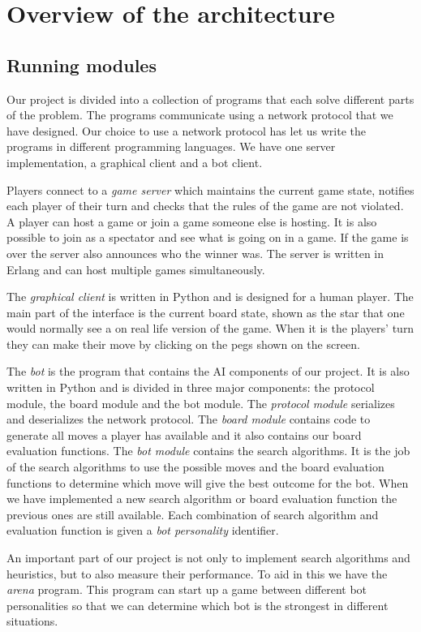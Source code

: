 \section{Overview of the architecture}
\subsection{Running modules}

Our project is divided into a collection of programs that each solve
different parts of the problem. The programs communicate using a
network protocol that we have designed. Our choice to use a network
protocol has let us write the programs in different programming
languages. We have one server implementation, a graphical client and a
bot client.


Players connect to a \emph{game server} which maintains the current
game state, notifies each player of their turn and checks that the
rules of the game are not violated. A player can host a game or join a
game someone else is hosting. It is also possible to join as a
spectator and see what is going on in a game. If the game is over the
server also announces who the winner was. The server is written in
Erlang and can host multiple games simultaneously.

The \emph{graphical client} is written in Python and is designed for a
human player. The main part of the interface is the current board
state, shown as the star that one would normally see a on real life
version of the game. When it is the players' turn they can make their
move by clicking on the pegs shown on the screen.

The \emph{bot} is the program that contains the AI components of our
project. It is also written in Python and is divided in three major
components: the protocol module, the board module and the bot module.
The \emph{protocol module} serializes and deserializes the network protocol.
The \emph{board module} contains code to generate all moves a player has
available and it also contains our board evaluation functions. The
\emph{bot module} contains the search algorithms. It is the job of the search
algorithms to use the possible moves and the board evaluation
functions to determine which move will give the best outcome for the
bot. When we have implemented a new search algorithm or board
evaluation function the previous ones are still available. Each
combination of search algorithm and evaluation function is given a
\emph{bot personality} identifier.

An important part of our project is not only to implement search
algorithms and heuristics, but to also measure their performance. To
aid in this we have the \emph{arena} program. This program can start
up a game between different bot personalities so that we can determine
which bot is the strongest in different situations.
